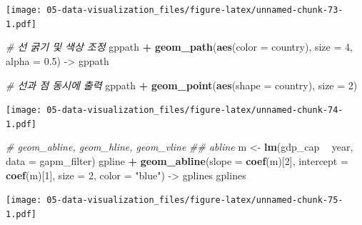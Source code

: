 \documentclass[
  11pt,
]{krantz}
\newenvironment{Shaded}{\begin{snugshade}}{\end{snugshade}}
\newcommand{\CommentTok}[1]{\textcolor[rgb]{0.37,0.37,0.37}{\textit{#1}}}
\newcommand{\DataTypeTok}[1]{\textcolor[rgb]{0.27,0.27,0.27}{#1}}
\newcommand{\DecValTok}[1]{\textcolor[rgb]{0.06,0.06,0.06}{#1}}
\newcommand{\FloatTok}[1]{\textcolor[rgb]{0.06,0.06,0.06}{#1}}
\newcommand{\KeywordTok}[1]{\textcolor[rgb]{0.27,0.27,0.27}{\textbf{#1}}}
\newcommand{\NormalTok}[1]{#1}
\newcommand{\OperatorTok}[1]{\textcolor[rgb]{0.43,0.43,0.43}{\textbf{#1}}}
\newcommand{\StringTok}[1]{\textcolor[rgb]{0.5,0.5,0.5}{#1}}
\begin{document}
\texttt{[image: 05-data-visualization\_files/figure-latex/unnamed-chunk-73-1.pdf]}

\normalsize

\footnotesize

\begin{Shaded}
\begin{Highlighting}[]
\CommentTok{# 선 굵기 및 색상 조정}
\NormalTok{gppath }\OperatorTok{+}\StringTok{ }
\StringTok{  }\KeywordTok{geom_path}\NormalTok{(}\KeywordTok{aes}\NormalTok{(}\DataTypeTok{color =}\NormalTok{ country), }
            \DataTypeTok{size =} \DecValTok{4}\NormalTok{, }
            \DataTypeTok{alpha =} \FloatTok{0.5}\NormalTok{) ->}\StringTok{ }\NormalTok{gppath}

\CommentTok{# 선과 점 동시에 출력}
\NormalTok{gppath }\OperatorTok{+}\StringTok{ }
\StringTok{  }\KeywordTok{geom_point}\NormalTok{(}\KeywordTok{aes}\NormalTok{(}\DataTypeTok{shape =}\NormalTok{ country), }
             \DataTypeTok{size =} \DecValTok{2}\NormalTok{)}
\end{Highlighting}
\end{Shaded}

\texttt{[image: 05-data-visualization\_files/figure-latex/unnamed-chunk-74-1.pdf]}

\normalsize

\footnotesize

\begin{Shaded}
\begin{Highlighting}[]
\CommentTok{# geom_abline, geom_hline, geom_vline}
\CommentTok{## abline}
\NormalTok{m <-}\StringTok{ }\KeywordTok{lm}\NormalTok{(gdp_cap }\OperatorTok{~}\StringTok{ }\NormalTok{year, }\DataTypeTok{data =}\NormalTok{ gapm_filter)}
\NormalTok{gpline }\OperatorTok{+}\StringTok{   }
\StringTok{  }\KeywordTok{geom_abline}\NormalTok{(}\DataTypeTok{slope =} \KeywordTok{coef}\NormalTok{(m)[}\DecValTok{2}\NormalTok{], }
              \DataTypeTok{intercept =} \KeywordTok{coef}\NormalTok{(m)[}\DecValTok{1}\NormalTok{], }
              \DataTypeTok{size =} \DecValTok{2}\NormalTok{, }
              \DataTypeTok{color =} \StringTok{"blue"}\NormalTok{) ->}\StringTok{ }\NormalTok{gplines}
\NormalTok{gplines}
\end{Highlighting}
\end{Shaded}

\texttt{[image: 05-data-visualization\_files/figure-latex/unnamed-chunk-75-1.pdf]}

\normalsize

\footnotesize
\end{document}

